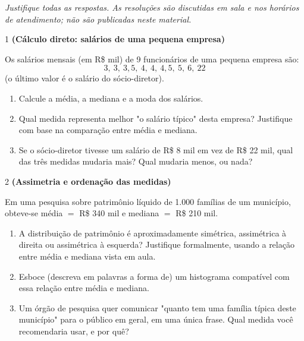 \documentclass[11pt]{article}
\begin{document}

\noindent \textit{Justifique todas as respostas. As resoluções são discutidas em sala e nos horários de atendimento; não são publicadas neste material.}

\begin{questao}{1} \textbf{(Cálculo direto: salários de uma pequena empresa)}

Os salários mensais (em R\$ mil) de 9 funcionários de uma pequena empresa são:
$$
3, \ 3, \ 3{,}5, \ 4, \ 4, \ 4{,}5, \ 5, \ 6, \ 22
$$
(o último valor é o salário do sócio-diretor).

\begin{enumerate}[label=(\alph*)]
  \item Calcule a média, a mediana e a moda dos salários.
  \item Qual medida representa melhor "o salário típico" desta empresa? Justifique com base na
    comparação entre média e mediana.
  \item Se o sócio-diretor tivesse um salário de R\$ 8 mil em vez de R\$ 22 mil, qual das três
    medidas mudaria mais? Qual mudaria menos, ou nada?
\end{enumerate}
\end{questao}

\begin{questao}{2} \textbf{(Assimetria e ordenação das medidas)}

Em uma pesquisa sobre patrimônio líquido de 1.000 famílias de um município, obteve-se
média $=$ R\$ 340 mil e mediana $=$ R\$ 210 mil.

\begin{enumerate}[label=(\alph*)]
  \item A distribuição de patrimônio é aproximadamente simétrica, assimétrica à direita ou
    assimétrica à esquerda? Justifique formalmente, usando a relação entre média e mediana vista
    em aula.
  \item Esboce (descreva em palavras a forma de) um histograma compatível com essa relação entre
    média e mediana.
  \item Um órgão de pesquisa quer comunicar "quanto tem uma família típica deste município" para o
    público em geral, em uma única frase. Qual medida você recomendaria usar, e por quê?
\end{enumerate}
\end{questao}
\end{document}
